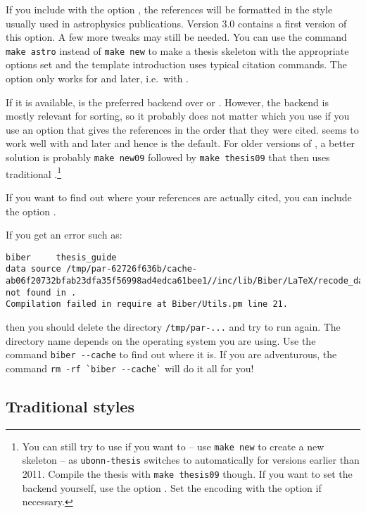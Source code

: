 If you include  with the option ,
the references will be formatted in the style usually used in astrophysics publications.
Version 3.0 contains a first version of this option.
A few more tweaks may still be needed. You can use the command
\verb|make astro| instead of \verb|make new| to make a thesis skeleton with the appropriate
options set and the template introduction uses typical citation commands.
The option  only works for  and later, i.e.\ with .

If it is available,  is the preferred backend over
 or .
However, the backend is mostly relevant for
sorting, so it probably does not matter which you use if you use an
option that gives the references in the order that they were
cited.  seems to work well with  and later and hence is the default.
For older versions of \TeXLive, a better solution is probably \texttt{make new09}
followed by \texttt{make thesis09} that then uses traditional \BibTeX.\footnote{%
You can still try to use  if you want to -- use \texttt{make new} to create a new skeleton --
as \texttt{ubonn-thesis} switches to  automatically for \TeXLive
versions earlier than 2011.
Compile the thesis with \texttt{make thesis09} though.
If you want to set the backend yourself, use the option .
Set the encoding with the option  if necessary.}

If you want to find out where your references are actually cited, you
can include the option .

If you get an error such as:
{\scriptsize
\begin{verbatim}
biber     thesis_guide
data source /tmp/par-62726f636b/cache-ab06f20732bfab23dfa35f56998ad4edca61bee1//inc/lib/Biber/LaTeX/recode_data.xml not found in .
Compilation failed in require at Biber/Utils.pm line 21.
\end{verbatim}
}
\noindent
then you should delete the directory \texttt{/tmp/par-...} and try to
run again. The directory name depends on the operating system you are using.
Use the command \verb|biber --cache| to find out where it is.
If you are adventurous, the command \verb|rm -rf `biber --cache`| will do it all for you!

\subsection{Traditional \BibTeX{} styles}
\label{sec:ref:bst}

